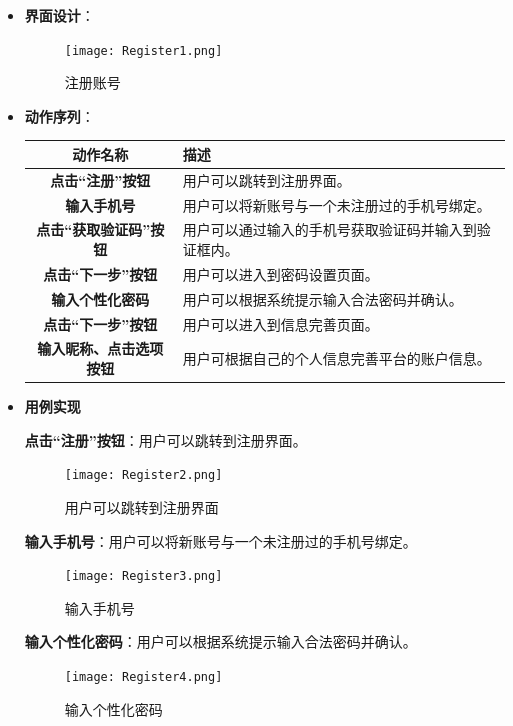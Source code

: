 \begin{itemize}
\item \textbf{界面设计}：
	\begin{figure}[H]
		\centering
		\texttt{[image: Register1.png]}
		\caption{注册账号}
	\end{figure}
	\item \textbf{动作序列}：
	\begin{table}[H]
		\centering
		\renewcommand\arraystretch{1.5}
		\begin{tabular}{|c|>{\raggedright\arraybackslash}p{10cm}|}
			\hline
			\textbf{动作名称} & \textbf{描述} \\ \hline
			\textbf{点击“注册”按钮} & 用户可以跳转到注册界面。\\ \hline
			\textbf{输入手机号} & 用户可以将新账号与一个未注册过的手机号绑定。\\ \hline
			\textbf{点击“获取验证码”按钮} & 用户可以通过输入的手机号获取验证码并输入到验证框内。\\ \hline
			\textbf{点击“下一步”按钮} & 用户可以进入到密码设置页面。\\ \hline
			\textbf{输入个性化密码} & 用户可以根据系统提示输入合法密码并确认。\\ \hline
			\textbf{点击“下一步”按钮} & 用户可以进入到信息完善页面。\\ \hline
			\textbf{输入昵称、点击选项按钮} & 用户可根据自己的个人信息完善平台的账户信息。\\ \hline
		\end{tabular}
	\end{table}

	\item \textbf{用例实现}

	\textbf{点击“注册”按钮}：用户可以跳转到注册界面。

	\begin{figure}[H]
		\centering
		\texttt{[image: Register2.png]}
		\caption{用户可以跳转到注册界面}
	\end{figure}

	\textbf{输入手机号}：用户可以将新账号与一个未注册过的手机号绑定。

	\begin{figure}[H]
		\centering
		\texttt{[image: Register3.png]}
		\caption{输入手机号}
	\end{figure}

	\textbf{输入个性化密码}：用户可以根据系统提示输入合法密码并确认。

	\begin{figure}[H]
		\centering
		\texttt{[image: Register4.png]}
		\caption{输入个性化密码}
	\end{figure}


\end{itemize}
